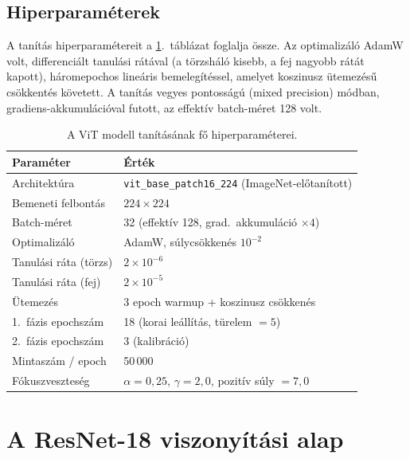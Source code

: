\subsection{Hiperparaméterek}

A tanítás hiperparamétereit a \ref{tab:hyperparams}.~táblázat foglalja össze. Az
optimalizáló AdamW volt, differenciált tanulási rátával (a törzsháló kisebb, a
fej nagyobb rátát kapott), háromepochos lineáris bemelegítéssel, amelyet koszinusz
ütemezésű csökkentés követett. A tanítás vegyes pontosságú (mixed precision)
módban, gradiens-akkumulációval futott, az effektív batch-méret 128 volt.

\begin{table}[H]
  \centering
  \caption{A ViT modell tanításának fő hiperparaméterei.}
  \label{tab:hyperparams}
  \begin{tabular}{ll}
    \hline
    \textbf{Paraméter} & \textbf{Érték} \\
    \hline
    Architektúra            & \texttt{vit\_base\_patch16\_224} (ImageNet-előtanított) \\
    Bemeneti felbontás      & $224 \times 224$ \\
    Batch-méret             & 32 (effektív 128, grad.\ akkumuláció $\times 4$) \\
    Optimalizáló            & AdamW, súlycsökkenés $10^{-2}$ \\
    Tanulási ráta (törzs)   & $2 \times 10^{-6}$ \\
    Tanulási ráta (fej)     & $2 \times 10^{-5}$ \\
    Ütemezés                & 3 epoch warmup + koszinusz csökkenés \\
    1.\ fázis epochszám     & 18 (korai leállítás, türelem $=5$) \\
    2.\ fázis epochszám     & 3 (kalibráció) \\
    Mintaszám / epoch       & 50\,000 \\
    Fókuszveszteség         & $\alpha = 0{,}25$, $\gamma = 2{,}0$, pozitív súly $= 7{,}0$ \\
    \hline
  \end{tabular}
\end{table}

\section{A ResNet-18 viszonyítási alap}


